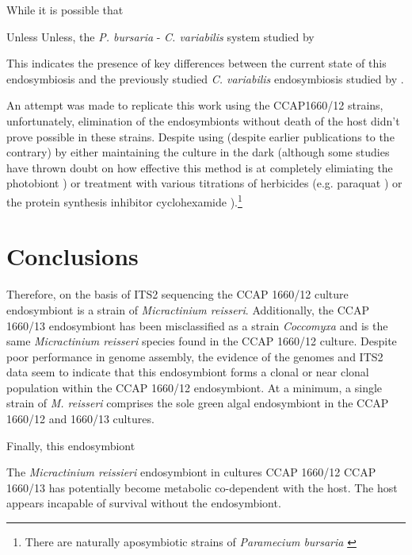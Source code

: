 While it is possible that 

Unless
Unless, the
\textit{P. bursaria} - \textit{C. variabilis} system studied by \citep{Kodama2014c}







This indicates the presence of key differences between the current state of this
endosymbiosis and the previously studied \textit{C. variabilis} endosymbiosis
studied by \citep{Kodama2014c}.


An attempt was made to replicate this work using the CCAP1660/12 strains, unfortunately, elimination of the endosymbionts without death of the host
didn't prove possible in these strains.  Despite using 
(despite earlier publications to the contrary) by either maintaining the culture in the dark \citep{Siegel1960} (although some studies have thrown doubt on
        how effective this method is at completely elimiating the photobiont \citep{Tanaka2002}) or treatment with various titrations of herbicides 
            (e.g. paraquat \citep{Hosoya1995a}) or the protein synthesis inhibitor cyclohexamide \citep{weis1984effect}).\footnote{
        There are naturally aposymbiotic strains of \textit{Paramecium bursaria} \citep{Tonooka2002a}}




\section{Conclusions}

Therefore, on the basis of ITS2 sequencing the CCAP 1660/12 culture endosymbiont is
a strain of \textit{Micractinium reisseri}.  Additionally, the CCAP 1660/13
endosymbiont has been misclassified as a strain \textit{Coccomyxa} and
is the same \textit{Micractinium reisseri} species found in the CCAP 1660/12 
culture. Despite poor performance in genome assembly, the evidence of
the genomes and ITS2 data seem to indicate that this endosymbiont
forms a clonal or near clonal population within the CCAP 1660/12
endosymbiont.  At a minimum, a single strain of \textit{M. reisseri} 
comprises the sole green algal endosymbiont in the CCAP 1660/12
and 1660/13 cultures. 

Finally, this endosymbiont 




The \textit{Micractinium reissieri} endosymbiont in cultures CCAP 1660/12 
CCAP 1660/13 has potentially become metabolic co-dependent with the host.
The host appears incapable of survival without the endosymbiont.  
